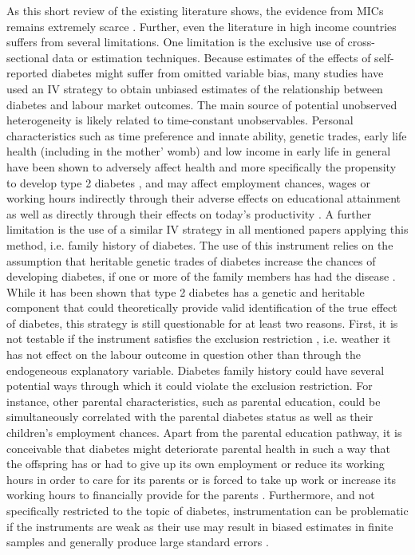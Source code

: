 As this short review of the existing literature shows, the evidence from \ac{MICs} remains  extremely scarce \citep{Seuring2015a}. Further, even  the literature  in high income countries suffers from several limitations. One limitation is the exclusive use of cross-sectional
data or estimation techniques. Because estimates of the effects of self-reported diabetes might
suffer from omitted variable bias, many studies have used an \ac{IV}
strategy to obtain unbiased estimates of the relationship between
diabetes and labour market outcomes. The main source of potential unobserved heterogeneity is likely related to time-constant unobservables. Personal characteristics such
as time preference and innate ability, genetic trades, early life
health (including in the mother' womb) and low income in early life
in general have been shown to adversely affect health and more specifically
the propensity to develop type 2 diabetes \citep{VanEwijk2011a,Sotomayor2013,Li2010b},
and may affect employment chances, wages or working hours indirectly
through their adverse effects on educational attainment \citep{Ayyagari2011b}
as well as directly through their effects on today's productivity
\citep{Currie2013}. A further limitation is the use of a similar \ac{IV} strategy in all mentioned papers applying this method, i.e. family history
of diabetes. The use of this instrument relies on the assumption that heritable genetic trades of diabetes increase the chances of developing diabetes, if one or more of the family members
has had the disease \citep{Brown2005,Latif2009,Minor2010a,Lin2011b,Seuring2015}. While it has been shown that type 2 diabetes has a genetic and heritable component that could theoretically provide valid identification of the true effect of diabetes, this strategy is still questionable for at least two reasons. First,
it is not testable if the instrument satisfies the exclusion restriction
 , i.e. weather it has not effect on the labour outcome in question other than through
the endogeneous explanatory variable. Diabetes family history could have several potential ways through which it could violate the exclusion restriction. For instance, other parental characteristics, such as parental education, could be simultaneously correlated with the parental diabetes status as well as their children’s
employment chances. Apart from the parental education pathway, it is conceivable that diabetes might deteriorate parental health in such a way that the offspring has or had to give
up its own employment or reduce its working hours in order to care for its parents or is forced to take up work or increase its working hours to financially provide for the parents \citep{Seuring2015}. Furthermore, and not specifically restricted to the topic of diabetes, instrumentation can be problematic if the instruments are weak as their use may result in biased estimates in finite samples and generally produce large standard errors \citep{Bound1995}. 

